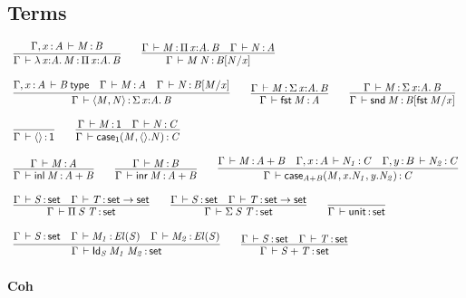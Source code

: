 \subsection{Terms}

\begin{small}
\[
\begin{array}{l}
\infer{\oftp{\Gamma}{\lam{x}{A}{M}}{\picl{x}{A}{B}}}
      {\oftp{\Gamma,\tptm{x}{A}}{M}{B}}
\qquad
\infer{\oftp{\Gamma}{\app{M}{N}}{\subst{B}{N}{x}}}
      {\oftp{\Gamma}{M}{\picl{x}{A}{B}} & \oftp{\Gamma}{N}{A}}
\\ \\
\infer{\oftp{\Gamma}{\pair{M}{N}}{\sigmacl{x}{A}{B}}}
      {\wftp{\Gamma,\tptm{x}{A}}{B} &
       \oftp{\Gamma}{M}{A} & \oftp{\Gamma}{N}{\subst{B}{M}{x}}}
\qquad
\infer{\oftp{\Gamma}{\fst{M}}{A}}
      {\oftp{\Gamma}{M}{\sigmacl{x}{A}{B}}}
\qquad
\infer{\oftp{\Gamma}{\snd{M}}{\subst{B}{\fst{M}}{x}}}
      {\oftp{\Gamma}{M}{\sigmacl{x}{A}{B}}}
\\ \\
\infer{\oftp{\Gamma}{\mt}{\unit}}
      {}
\qquad
\infer{\oftp{\Gamma}{\unitcase{M}{N}}{C}}
      {\oftp{\Gamma}{M}{\unit} & \oftp{\Gamma}{N}{C}}
\\ \\
\infer{\oftp{\Gamma}{\inl{M}}{\sm{A}{B}}}
      {\oftp{\Gamma}{M}{A}}
\qquad
\infer{\oftp{\Gamma}{\inr{M}}{\sm{A}{B}}}
      {\oftp{\Gamma}{M}{B}}
\qquad
\infer{\oftp{\Gamma}{\smcase{\sm{A}{B}}{M}{x.N_1}{y.N_2}}{C}}
      {\oftp{\Gamma}{M}{\sm{A}{B}} &
       \oftp{\Gamma,\tptm{x}{A}}{N_1}{C} &
       \oftp{\Gamma,\tptm{y}{B}}{N_2}{C}}
\\ \\
\infer{\oftp{\Gamma}{\picd{S}{T}}{\set}}
      {\oftp{\Gamma}{S}{\set} & \oftp{\Gamma}{T}{\set\to\set}} %
\qquad
\infer{\oftp{\Gamma}{\sigmacd{S}{T}}{\set}}
      {\oftp{\Gamma}{S}{\set} & \oftp{\Gamma}{T}{\set\to\set}} %
\qquad
\infer{\oftp{\Gamma}{\unitcd}{\set}}{}
\\ \\ 
\infer{\oftp{\Gamma}{\idcd{S}{M_1}{M_2}}{\set}}
      {\oftp{\Gamma}{S}{\set} &
       \oftp{\Gamma}{M_1}{\el{S}} & 
       \oftp{\Gamma}{M_2}{\el{S}}}
\qquad
\infer{\oftp{\Gamma}{\smcd{S}{T}}{\set}}
      {\oftp{\Gamma}{S}{\set} & \oftp{\Gamma}{T}{\set}}
\end{array}
\]
\end{small}

\paragraph{Coh}

